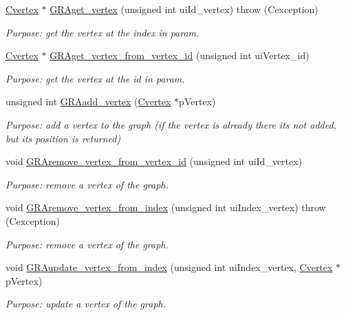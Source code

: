 \begin{DoxyCompactItemize}
\hyperlink{class_cvertex}{Cvertex} $\ast$ \hyperlink{class_cgraph_aca872915fd8745ae14ba41afbb0dec0a}{G\+R\+Aget\+\_\+vertex} (unsigned int ui\+Id\+\_\+vertex)  throw (\+Cexception)
\begin{DoxyCompactList}\small\item\em Purpose\+: get the vertex at the index in param. \end{DoxyCompactList}\item 
\hyperlink{class_cvertex}{Cvertex} $\ast$ \hyperlink{class_cgraph_a773062af5c90eb8b3caf083265b1fefe}{G\+R\+Aget\+\_\+vertex\+\_\+from\+\_\+vertex\+\_\+id} (unsigned int ui\+Vertex\+\_\+id)
\begin{DoxyCompactList}\small\item\em Purpose\+: get the vertex at the id in param. \end{DoxyCompactList}\item 
unsigned int \hyperlink{class_cgraph_ac23521c4babdef352f7a88321032a7ec}{G\+R\+Aadd\+\_\+vertex} (\hyperlink{class_cvertex}{Cvertex} $\ast$p\+Vertex)
\begin{DoxyCompactList}\small\item\em Purpose\+: add a vertex to the graph (if the vertex is already there it\textquotesingle{}s not added, but it\textquotesingle{}s position is returned) \end{DoxyCompactList}\item 
void \hyperlink{class_cgraph_a0ec274e04f17384410effb7b802918e6}{G\+R\+Aremove\+\_\+vertex\+\_\+from\+\_\+vertex\+\_\+id} (unsigned int ui\+Id\+\_\+vertex)
\begin{DoxyCompactList}\small\item\em Purpose\+: remove a vertex of the graph. \end{DoxyCompactList}\item 
void \hyperlink{class_cgraph_a9086d7228eadb2f30b116466957c9a79}{G\+R\+Aremove\+\_\+vertex\+\_\+from\+\_\+index} (unsigned int ui\+Index\+\_\+vertex)  throw (\+Cexception)
\begin{DoxyCompactList}\small\item\em Purpose\+: remove a vertex of the graph. \end{DoxyCompactList}\item 
void \hyperlink{class_cgraph_a7a57ff55a576088f502830da3234c685}{G\+R\+Aupdate\+\_\+vertex\+\_\+from\+\_\+index} (unsigned int ui\+Index\+\_\+vertex, \hyperlink{class_cvertex}{Cvertex} $\ast$p\+Vertex)
\begin{DoxyCompactList}\small\item\em Purpose\+: update a vertex of the graph. \end{DoxyCompactList}\item 

\end{DoxyCompactItemize}
